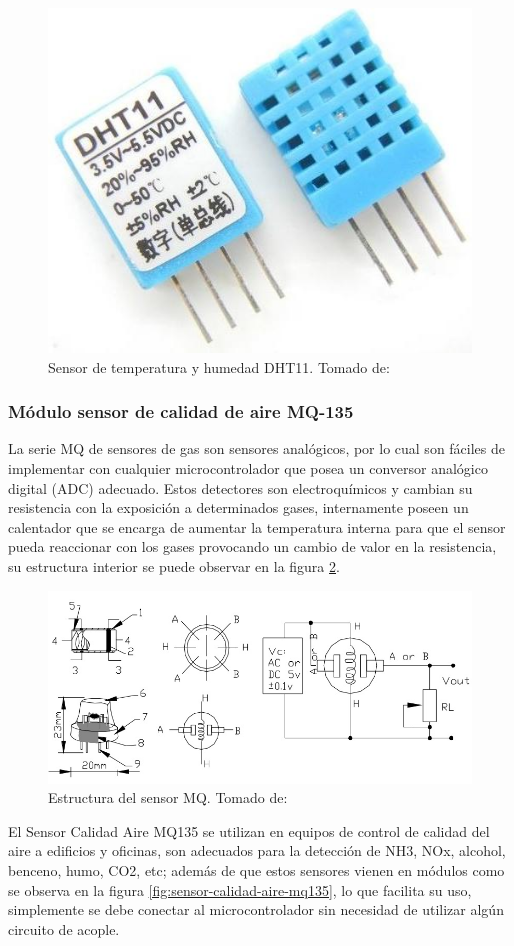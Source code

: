 \begin{figure}[H]
	\centering
	\caption{Sensor de temperatura y humedad DHT11. Tomado de: \cite{DHT11}}
	\label{fig:dht11}
	\includegraphics[width=0.4\linewidth]{Imagenes/dht11}
\end{figure}


\subsubsection{Módulo sensor de calidad de aire MQ-135}

La serie MQ de sensores de gas son sensores analógicos, por lo cual son fáciles de implementar con cualquier microcontrolador que posea un conversor analógico digital (ADC) adecuado. Estos detectores son electroquímicos y cambian su resistencia con la exposición a determinados gases, internamente poseen un calentador que se encarga de aumentar la temperatura interna para que el sensor pueda reaccionar con los gases provocando un cambio de valor en la resistencia, su estructura interior se puede observar en la figura \ref{fig:estructura-del-sensor-mq}.\cite{MQ1}

\begin{figure}[H]
	\centering
	\caption{Estructura del sensor MQ. Tomado de: \cite{MQ1}}
	\label{fig:estructura-del-sensor-mq}
	\includegraphics[width=0.7\linewidth]{Imagenes/Estructura_del_sensor_MQ}
\end{figure}

El Sensor Calidad Aire MQ135 se utilizan en equipos de control de calidad del aire a edificios y oficinas, son adecuados para la detección de NH3, NOx, alcohol, benceno, humo, CO2, etc; además de que estos sensores vienen en módulos como se observa en la figura \ref{fig:sensor-calidad-aire-mq135}, lo que facilita su uso, simplemente se debe conectar al microcontrolador sin necesidad de utilizar algún circuito de acople. \cite{MQ1}

